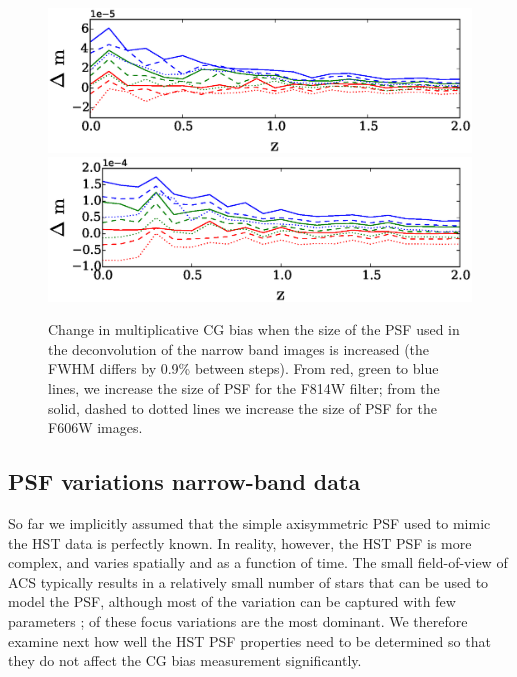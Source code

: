 \documentclass[useAMS,usenatbib]{mnras}
\begin{document}
\begin{figure}
\includegraphics[width=\hsize]{varpsfB.eps}
\includegraphics[width=\hsize]{varpsfS.eps}
\caption{Change in multiplicative CG bias when the size of the PSF used in the deconvolution
of the narrow band images is increased (the FWHM differs by 0.9\% between steps). From red, 
green to blue lines, we increase the size of PSF for the F814W filter; from the solid, dashed to dotted 
lines we  increase the size of PSF for the F606W images.}
\label{fig:psfacc1}
\end{figure}

\subsection{PSF variations narrow-band data}
\label{sec:psfmodel}

So far we implicitly assumed that the simple axisymmetric PSF used to mimic the HST data
is perfectly known. In reality, however, the HST PSF is more complex, and varies spatially
and as a function of time. The small field-of-view of ACS typically results in a relatively small number
of stars that can be used to model the PSF, although most of the variation can be captured with
few parameters \citep[e.g.][]{Schrabback10}; of these focus variations are the most dominant. We therefore examine next how well the HST PSF  properties need to be determined so that they do not affect the CG bias measurement significantly. 
\end{document}
